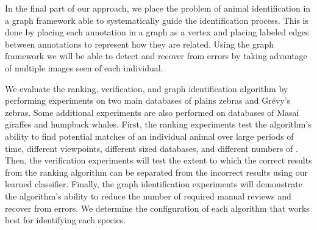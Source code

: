     In the final part of our approach, we place the problem of animal identification in a graph framework able to
    systematically guide the identification process. This is done by placing each annotation in a graph as a vertex and
    placing labeled edges between annotations to represent how they are related. Using the graph framework we will be
    able to detect and recover from errors by taking advantage of multiple images seen of each individual.

    We evaluate the ranking, verification, and graph identification algorithm by performing experiments on two
      main databases of plains zebras and Grévy's zebras.
    Some additional experiments are also performed on databases of Masai giraffes and humpback whales.
    First, the ranking experiments test the algorithm's ability to find potential matches of an individual animal
      over large periods of time, different viewpoints, different sized databases, and different numbers of
      \exemplars{}.
    Then, the verification experiments will test the extent to which the correct results from the ranking
      algorithm can be separated from the incorrect results using our learned classifier.
    Finally, the graph identification experiments will demonstrate the algorithm's ability to reduce the number
      of required manual reviews and recover from errors.
    We determine the configuration of each algorithm that works best for identifying each species.
    
    


